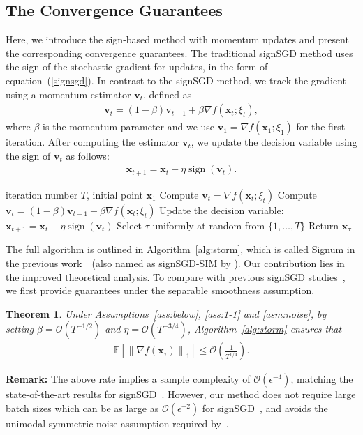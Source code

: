 \documentclass{article}
\newcommand{\E}{\mathbb{E}}
\newtheorem{theorem}{Theorem}[section]
\newcommand{\Norm}[1]{\left\|#1\right\|}
\def \E {\mathbb{E}}
\def \v {\mathbf{v}}
\def \x {\mathbf{x}}
\def \E {\mathbb{E}}
\def \x {\mathbf{x}}
\def \v {\mathbf{v}}
\begin{document}
\subsection{The Convergence Guarantees}
Here, we introduce the sign-based method with momentum updates and present the corresponding convergence guarantees. The traditional signSGD method uses the sign of the stochastic gradient for updates, in the form of equation~(\ref{signsgd}). In contrast to the signSGD method, we track the gradient using a momentum estimator $\v_t$, defined as
\begin{align}
    \v_t =  (1-\beta)\v_{t-1} + \beta \nabla f(\x_t;\xi_t),
\end{align}
where $\beta$ is the momentum parameter and we use $\v_1 = \nabla f(\x_1; \xi_1)$ for the first iteration. After computing the estimator $\v_t$, we update the decision variable using the sign of $\v_t$ as follows:
\begin{align}
    \x_{t+1} = \x_t - \eta \operatorname{sign}\left(\v_t\right).
\end{align}
\begin{algorithm}[t]
	\caption{Signum}
	\label{alg:storm}
	\begin{algorithmic}[1]
	 iteration number $T$, initial point $\x_1$
        \STATE Compute $\v_t = \nabla f(\x_t;\xi_t) $
        \ELSE
        \STATE Compute $\v_t = (1-\beta) \v_{t-1 } + \beta \nabla f(\x_t;\xi_t) $
        \ENDIF
		\STATE Update the decision variable: $\x_{t+1} = \x_t - \eta \operatorname{sign}\left(\v_t\right)$
		\ENDFOR
	\STATE Select $\tau$ uniformly at random from $\{1, \ldots, T\}$
	\STATE Return $\x_\tau$
	\end{algorithmic}
\end{algorithm}
The full algorithm is outlined in Algorithm~\ref{alg:storm}, which is called Signum in the previous work~\citep{pmlr-v80-bernstein18a}~(also named as signSGD-SIM by \citet{pmlr-v202-sun23l}). Our contribution lies in the improved theoretical analysis. To compare with previous signSGD studies~\citep{pmlr-v80-bernstein18a, bernstein2018signsgd}, we first provide guarantees under the separable smoothness assumption.
\begin{theorem}\label{thm2}
    Under Assumptions~\ref{ass:below}, \ref{ass:1-1} and \ref{asm:noise}, by setting  $\beta=\mathcal{O}\left(T^{-1/2}\right)$ and $\eta=\mathcal{O}\left(T^{-3/4}\right)$, Algorithm~\ref{alg:storm} ensures that
    \begin{align*}
        \E\left[\Norm{\nabla f(\x_\tau)}_1\right]\leq\mathcal{O}\left(\frac{1}{T^{1/4}}\right).
    \end{align*}
\end{theorem}
\textbf{Remark:} The above rate implies a sample complexity of $\mathcal{O}(\epsilon^{-4})$, matching the state-of-the-art results for signSGD~\citep{pmlr-v80-bernstein18a, bernstein2018signsgd}. However, our method does not require large batch sizes which can be as large as $\mathcal{O}(\epsilon^{-2})$ for signSGD~\citep{pmlr-v80-bernstein18a}, and avoids the unimodal symmetric noise assumption required by~\cite{bernstein2018signsgd}. 
\end{document}
